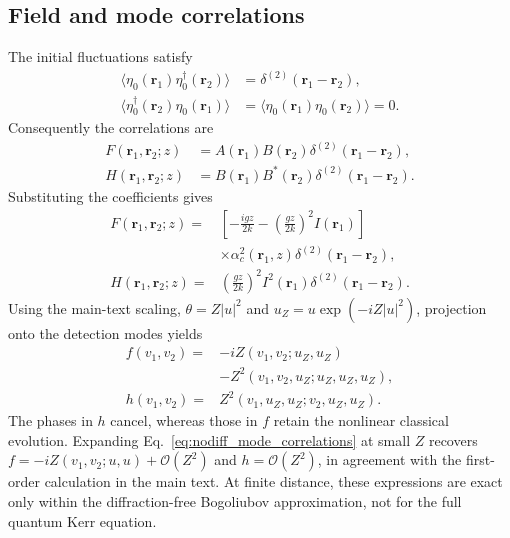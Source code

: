 \documentclass[%
 reprint,
 amsmath,amssymb,
 aps,
pra,
twocolumn,
]{revtex4-2}
\begin{document}
\subsection{Field and mode correlations}

The initial fluctuations satisfy
\begin{equation}
\begin{aligned}
    \langle\eta_0(\mathbf r_1)\eta_0^\dagger(\mathbf r_2)\rangle
       &=\delta^{(2)}(\mathbf r_1-\mathbf r_2),\\
    \langle\eta_0^\dagger(\mathbf r_2)\eta_0(\mathbf r_1)\rangle
       &=\langle\eta_0(\mathbf r_1)\eta_0(\mathbf r_2)\rangle=0.
\end{aligned}
\end{equation}
Consequently the correlations are
\begin{equation}
\begin{aligned}
    F(\mathbf r_1,\mathbf r_2;z)
       &=A(\mathbf r_1)B(\mathbf r_2)\delta^{(2)}(\mathbf r_1-\mathbf r_2),\\
    H(\mathbf r_1,\mathbf r_2;z)
       &=B(\mathbf r_1)B^*(\mathbf r_2)\delta^{(2)}(\mathbf r_1-\mathbf r_2).
\end{aligned}
\end{equation}
Substituting the coefficients gives
\begin{equation}
\begin{aligned}
    F(\mathbf r_1,\mathbf r_2;z)
       ={}&\left[-\frac{igz}{2k}-\left(\frac{gz}{2k}\right)^2I(\mathbf r_1)\right]\\
       &\times\alpha_c^2(\mathbf r_1,z)\delta^{(2)}(\mathbf r_1-\mathbf r_2),\\
    H(\mathbf r_1,\mathbf r_2;z)
       ={}&\left(\frac{gz}{2k}\right)^2I^2(\mathbf r_1)
                         \delta^{(2)}(\mathbf r_1-\mathbf r_2).
\end{aligned}
    \label{eq:nodiff_field_correlations}
\end{equation}
Using the main-text scaling, $\theta=Z|u|^2$ and $u_Z=u\exp(-iZ|u|^2)$, projection onto the detection modes yields
\begin{equation}
\begin{aligned}
    f(v_1,v_2)={}&-iZ(v_1,v_2;u_Z,u_Z)\\
                &-Z^2(v_1,v_2,u_Z;u_Z,u_Z,u_Z),\\
    h(v_1,v_2)={}&Z^2(v_1,u_Z,u_Z;v_2,u_Z,u_Z).
\end{aligned}
    \label{eq:nodiff_mode_correlations}
\end{equation}
The phases in $h$ cancel, whereas those in $f$ retain the nonlinear classical evolution. Expanding Eq.~\eqref{eq:nodiff_mode_correlations} at small $Z$ recovers $f=-iZ(v_1,v_2;u,u)+\mathcal{O}(Z^2)$ and $h=\mathcal{O}(Z^2)$, in agreement with the first-order calculation in the main text. At finite distance, these expressions are exact only within the diffraction-free Bogoliubov approximation, not for the full quantum Kerr equation.
\end{document}

